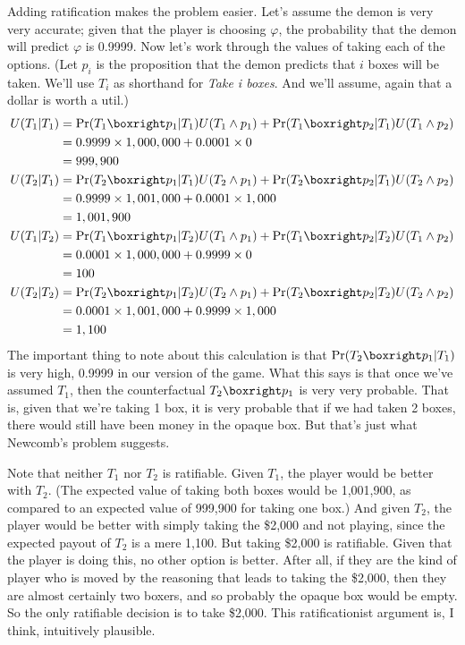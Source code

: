 Adding ratification makes the problem easier. Let's assume the demon is very very accurate; given that the player is choosing $\varphi$, the probability that the demon will predict $\varphi$ is 0.9999. Now let's work through the values of taking each of the options. (Let $p_i$ is the proposition that the demon predicts that $i$ boxes will be taken. We'll use $T_i$ as shorthand for \textit{Take i boxes}. And we'll assume, again that a dollar is worth a util.)
\begin{align*}
U(T_1 | T_1) &= \Pr(T_1 \boxright p_1 | T_1)U(T_1 \wedge p_1) + \Pr(T_1 \boxright p_2 | T_1)U(T_1 \wedge p_2) \\
&= 0.9999 \times 1,000,000 + 0.0001 \times 0 \\
&= 999,900 \\
U(T_2 | T_1) &= \Pr(T_2 \boxright p_1 | T_1)U(T_2 \wedge p_1) + \Pr(T_2 \boxright p_2 | T_1)U(T_2 \wedge p_2) \\
&= 0.9999 \times 1,001,000 + 0.0001 \times 1,000 \\
&= 1,001,900 \\
U(T_1 | T_2) &= \Pr(T_1 \boxright p_1 | T_2)U(T_1 \wedge p_1) + \Pr(T_1 \boxright p_2 | T_2)U(T_1 \wedge p_2) \\
&= 0.0001 \times 1,000,000 + 0.9999 \times 0 \\
&= 100 \\
U(T_2 | T_2) &= \Pr(T_2 \boxright p_1 | T_2)U(T_2 \wedge p_1) + \Pr(T_2 \boxright p_2 | T_2)U(T_2 \wedge p_2) \\
&= 0.0001 \times 1,001,000 + 0.9999 \times 1,000 \\
&= 1,100	
\end{align*} The important thing to note about this calculation is that $\Pr(T_2 \boxright p_1 | T_1)$ is very high, 0.9999 in our version of the game. What this says is that once we've assumed $T_1$, then the counterfactual $T_2 \boxright p_1$ is very very probable. That is, given that we're taking 1 box, it is very probable that if we had taken 2 boxes, there would still have been money in the opaque box. But that's just what Newcomb's problem suggests.

Note that neither $T_1$ nor $T_2$ is ratifiable. Given $T_1$, the player would be better with $T_2$. (The expected value of taking both boxes would be 1,001,900, as compared to an expected value of 999,900 for taking one box.) And given $T_2$, the player would be better with simply taking the \$2,000 and not playing, since the expected payout of $T_2$ is a mere 1,100. But taking \$2,000 is ratifiable. Given that the player is doing this, no other option is better. After all, if they are the kind of player who is moved by the reasoning that leads to taking the \$2,000, then they are almost certainly two boxers, and so probably the opaque box would be empty. So the only ratifiable decision is to take \$2,000. This ratificationist argument is, I think, intuitively plausible.

